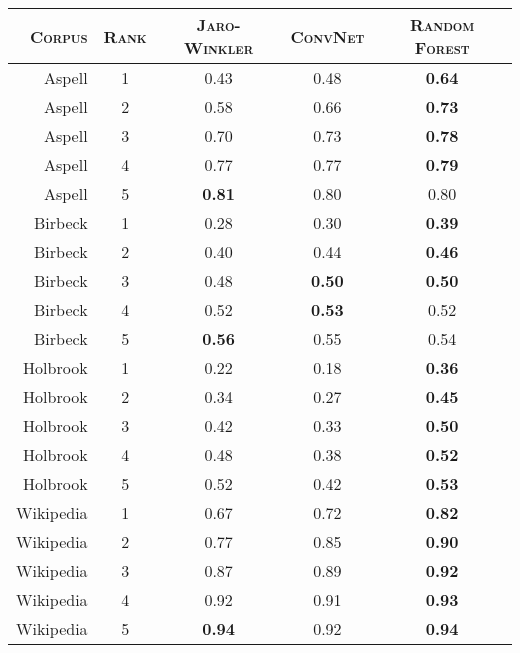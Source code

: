 \begin{tabular}{rcccc}
  \hline
\textsc{Corpus} & \textsc{Rank} & \textsc{Jaro-Winkler} & \textsc{ConvNet} & \textsc{Random Forest} \\ 
  \hline
Aspell &   1 & 0.43 & 0.48 & \textbf{0.64} \\ 
Aspell &   2 & 0.58 & 0.66 & \textbf{0.73} \\ 
Aspell &   3 & 0.70 & 0.73 & \textbf{0.78} \\ 
Aspell &   4 & 0.77 & 0.77 & \textbf{0.79} \\ 
Aspell &   5 & \textbf{0.81} & 0.80 & 0.80 \\ 
Birbeck &   1 & 0.28 & 0.30 & \textbf{0.39} \\ 
Birbeck &   2 & 0.40 & 0.44 & \textbf{0.46} \\ 
Birbeck &   3 & 0.48 & \textbf{0.50} & \textbf{0.50} \\ 
Birbeck &   4 & 0.52 & \textbf{0.53} & 0.52 \\ 
Birbeck &   5 & \textbf{0.56} & 0.55 & 0.54 \\ 
Holbrook &   1 & 0.22 & 0.18 & \textbf{0.36} \\ 
Holbrook &   2 & 0.34 & 0.27 & \textbf{0.45} \\ 
Holbrook &   3 & 0.42 & 0.33 & \textbf{0.50} \\ 
Holbrook &   4 & 0.48 & 0.38 & \textbf{0.52} \\ 
Holbrook &   5 & 0.52 & 0.42 & \textbf{0.53} \\ 
Wikipedia &   1 & 0.67 & 0.72 & \textbf{0.82} \\ 
Wikipedia &   2 & 0.77 & 0.85 & \textbf{0.90} \\ 
Wikipedia &   3 & 0.87 & 0.89 & \textbf{0.92} \\ 
Wikipedia &   4 & 0.92 & 0.91 & \textbf{0.93} \\ 
Wikipedia &   5 & \textbf{0.94} & 0.92 & \textbf{0.94} \\ 
\end{tabular}